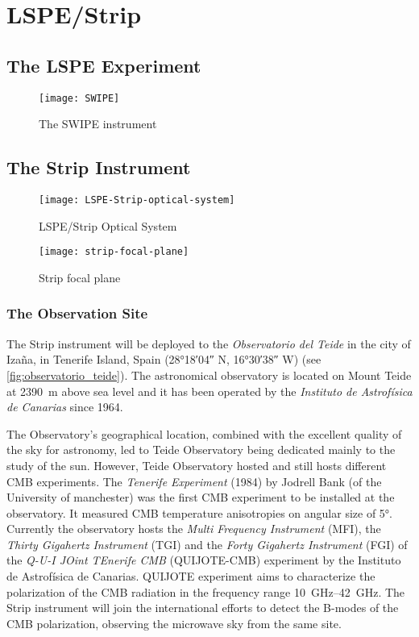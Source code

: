 \chapter{LSPE/Strip}

\section{The LSPE Experiment}

\begin{figure}
        \centering
        \texttt{[image: SWIPE]}
        \caption{The SWIPE instrument}
        \label{fig:swipe}
\end{figure}

\section{The Strip Instrument}

\begin{figure}
        \centering
        \texttt{[image: LSPE-Strip-optical-system]}
        \caption{LSPE/Strip Optical System}
        \label{fig:lspe-strip_optical_system}
\end{figure}

\begin{figure}
        \centering
        \texttt{[image: strip-focal-plane]}
        \caption{Strip focal plane}
        \label{fig:strip_focal_plane}
\end{figure}

\subsection{The Observation Site}

The Strip instrument will be deployed to the \emph{Observatorio del Teide}
in the city of Iza\~na, in Tenerife Island, Spain (\ang{28;18;04} N,
\ang{16;30;38} W) (see \autoref{fig:observatorio_teide}). The astronomical
observatory is located on Mount Teide at \SI{2390}{\meter} above sea level
and it has been operated by the \emph{Instituto de Astrof\'isica de
Canarias} since 1964.

The Observatory's geographical location, combined with the excellent
quality of the sky for astronomy, led to Teide Observatory being dedicated
mainly to  the study of the sun. However, Teide Observatory hosted and
still hosts different CMB experiments.
The \emph{Tenerife Experiment} (1984) by Jodrell Bank (of the University of
manchester) was the first CMB experiment to be installed at the
observatory. It measured CMB temperature anisotropies on angular size of
\ang{5}. Currently the observatory hosts the \emph{Multi Frequency
Instrument} (MFI), the \emph{Thirty Gigahertz Instrument} (TGI) and the
\emph{Forty Gigahertz Instrument} (FGI) of the \emph{Q-U-I JOint TEnerife
CMB} (QUIJOTE-CMB) experiment by the Instituto de Astrof\'isica de
Canarias. QUIJOTE experiment aims to characterize the
polarization of the CMB radiation in the frequency range
\SIrange{10}{42}{\giga\hertz}. The Strip instrument will join the
international efforts to detect the B-modes of the CMB polarization,
observing the microwave sky from the same site.

